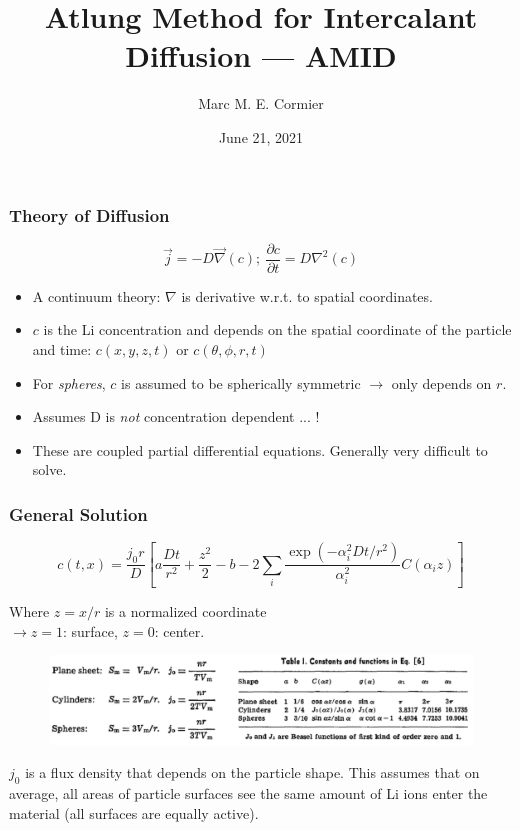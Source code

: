 \documentclass{beamer}
\title[AMID]{Atlung Method for Intercalant Diffusion --- AMID}
\author{Marc M. E. Cormier} %
\institute[] %
{
	Dalhousie University \\ %
	\medskip
	\textit{marc.cormier@dal.ca} %
}
\date{June 21, 2021} %
\begin{document}
	
\begin{frame}
\titlepage %
\end{frame}

\begin{frame}
\frametitle{Theory of Diffusion}

	\begin{equation*}
	\vec{j} = -D \vec{\nabla}(c);\ \frac{\partial c}{\partial t} = D \nabla^2(c)
	\end{equation*}
	\begin{itemize}
		\item A continuum theory: $\nabla$ is derivative w.r.t. to spatial coordinates.
		\item $c$ is the Li concentration and depends on the spatial coordinate of the particle and time: $c(x,y,z,t)$ or $c(\theta,\phi,r,t)$
		\item For \emph{spheres}, $c$ is assumed to be spherically symmetric $\rightarrow$ only depends on $r$.
		\item {\color{red} Assumes D is \emph{not} concentration dependent ... !}
		\item These are coupled partial differential equations. Generally very difficult to solve.
	\end{itemize}
	 
\end{frame}

\begin{frame}
\frametitle{General Solution}

\begin{equation*}
c(t,x) = \frac{j_0 r}{D} \left[ a\frac{Dt}{r^2} + \frac{z^2}{2} - b - 2 \sum_{i} \frac{\exp(-\alpha_i^2Dt/r^2)}{\alpha_i^2} C(\alpha_i z) \right]
\end{equation*}

Where $z=x/r$ is a normalized coordinate \\ 
$\rightarrow z=1$: surface, $z=0$: center.

\begin{figure}
	\includegraphics[width=1.0\linewidth]{figs/diff_eqn_parameters.pdf}
\end{figure}

$j_0$ is a flux density that depends on the particle shape. This assumes that on average, all areas of particle surfaces see the same amount of Li ions enter the material (all surfaces are equally active).


\end{frame}
\end{document}
